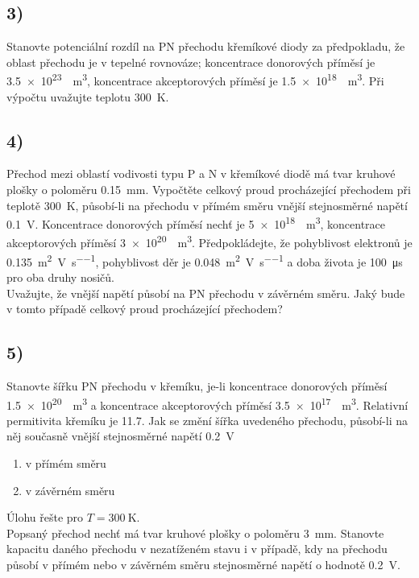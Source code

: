 \newpage


\subsection*{3)}

Stanovte potenciální rozdíl na PN přechodu křemíkové diody za předpokladu, že oblast přechodu je v tepelné rovnováze; koncentrace donorových příměsí je \SI{3,5e23}{\per\cubic\meter}, koncentrace akceptorových příměsí je \SI{1,5e18}{\per\cubic\meter}. Při výpočtu uvažujte teplotu \SI{300}{\kelvin}.

\newpage


\subsection*{4)}

Přechod mezi oblastí vodivosti typu P a N v křemíkové diodě má tvar kruhové plošky o poloměru \SI{0,15}{\milli\meter}. Vypočtěte celkový proud procházející přechodem při teplotě \SI{300}{\kelvin}, působí-li na přechodu v přímém směru vnější stejnosměrné napětí \SI{0,1}{\volt}. Koncentrace donorových příměsí nechť je \SI{5e18}{\per\cubic\meter}, koncentrace akceptorových příměsí \SI{3e20}{\per\cubic\meter}. Předpokládejte, že pohyblivost elektronů je \SI{0,135}{\meter\squared\per\volt\per\second}, pohyblivost děr je \SI{0,048}{\meter\squared\per\volt\per\second} a doba života je \SI{100}{\micro\second} pro oba druhy nosičů. \\
Uvažujte, že vnější napětí působí na PN přechodu v závěrném směru. Jaký bude v tomto případě celkový proud procházející přechodem?

\newpage


\subsection*{5)}

Stanovte šířku PN přechodu v křemíku, je-li koncentrace donorových příměsí \SI{1,5e20}{\per\cubic\meter} a koncentrace akceptorových příměsí \SI{3,5e17}{\per\cubic\meter}. Relativní permitivita křemíku je \SI{11,7}{}. Jak se změní šířka uvedeného přechodu, působí-li na něj současně vnější stejnosměrné napětí \SI{0,2}{\volt} 
\begin{enumerate}[label=\alph*)]
    \item v přímém směru
    \item v závěrném směru
\end{enumerate}
Úlohu řešte pro $T=\SI{300}{\kelvin}$. \\
Popsaný přechod nechť má tvar kruhové plošky o poloměru \SI{3}{\milli\meter}. Stanovte kapacitu daného přechodu v nezatíženém stavu i v případě, kdy na přechodu působí v přímém nebo v závěrném směru stejnosměrné napětí o hodnotě \SI{0,2}{\volt}.

